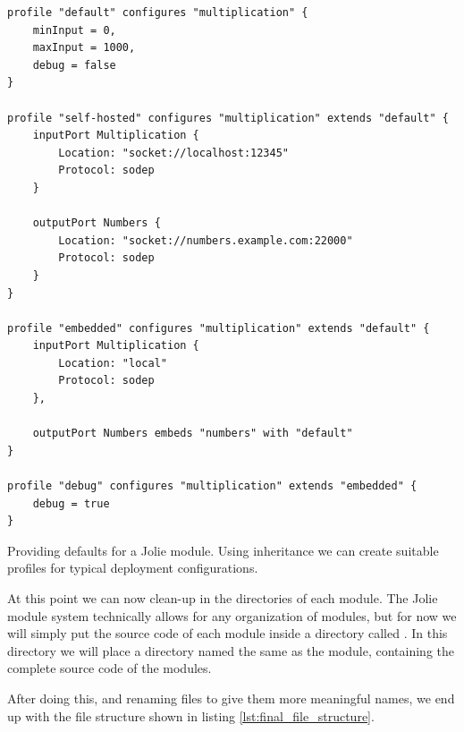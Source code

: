 \begin{listing}[H]
\begin{verbatim}
profile "default" configures "multiplication" {
    minInput = 0,
    maxInput = 1000,
    debug = false
}

profile "self-hosted" configures "multiplication" extends "default" {
    inputPort Multiplication {
        Location: "socket://localhost:12345"
        Protocol: sodep
    }

    outputPort Numbers {
        Location: "socket://numbers.example.com:22000"
        Protocol: sodep
    }
}

profile "embedded" configures "multiplication" extends "default" {
    inputPort Multiplication {
        Location: "local"
        Protocol: sodep
    },

    outputPort Numbers embeds "numbers" with "default"
}

profile "debug" configures "multiplication" extends "embedded" {
    debug = true
}
\end{verbatim}

\caption{Providing defaults for a Jolie module. Using inheritance we can create
suitable profiles for typical deployment configurations.}

\label{lst:mult_default_config}

\end{listing}

At this point we can now clean-up in the directories of each module. The Jolie
module system technically allows for any organization of modules, but for now
we will simply put the source code of each module inside a directory called
. In this directory we will place a directory named the same as
the module, containing the complete source code of the modules.

After doing this, and renaming files to give them more meaningful names, we end
up with the file structure shown in listing \ref{lst:final_file_structure}.

